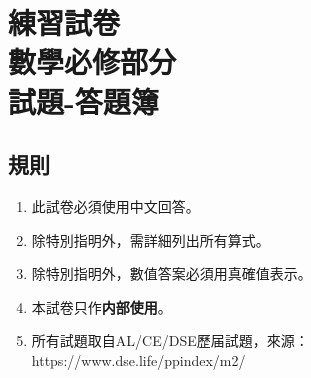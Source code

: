 \documentclass[11pt]{article}
\begin{document}
    \thispagestyle{plain}

    \centering 

    \section*{練習試卷\\數學必修部分\\試題-答題簿}

    \raggedright

    \subsection*{規則}

    \begin{enumerate}
        \item 此試卷必須使用中文回答。
        \item 除特別指明外，需詳細列出所有算式。
        \item 除特別指明外，數值答案必須用真確值表示。
        \item 本試卷只作\textbf{内部使用}。
        \item 所有試題取自AL/CE/DSE歷届試題，來源： https://www.dse.life/ppindex/m2/
    \end{enumerate}
    \newpage
\end{document}

